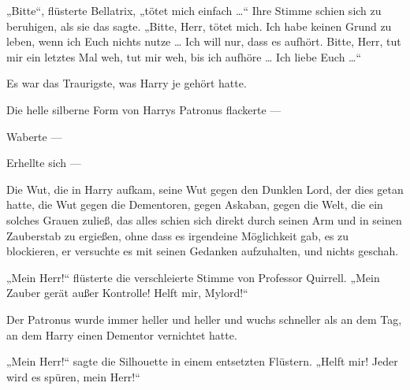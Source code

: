 „Bitte“, flüsterte Bellatrix, „tötet mich einfach …“ Ihre Stimme schien sich zu beruhigen, als sie das sagte.
„Bitte, Herr, tötet mich. Ich habe keinen Grund zu leben, wenn ich Euch nichts nutze … Ich will nur, dass es aufhört. Bitte, Herr, tut mir ein letztes Mal weh, tut mir weh, bis ich aufhöre … Ich liebe Euch …“

Es war das Traurigste, was Harry je gehört hatte.

Die helle silberne Form von Harrys Patronus flackerte —

Waberte —

Erhellte sich —

Die Wut, die in Harry aufkam, seine Wut gegen den Dunklen Lord, der dies getan hatte, die Wut gegen die Dementoren, gegen Askaban, gegen die Welt, die ein solches Grauen zuließ, das alles schien sich direkt durch seinen Arm und in seinen Zauberstab zu ergießen, ohne dass es irgendeine Möglichkeit gab, es zu blockieren, er versuchte es mit seinen Gedanken aufzuhalten, und nichts geschah.

„Mein Herr!“ flüsterte die verschleierte Stimme von Professor Quirrell.
„Mein Zauber gerät außer Kontrolle! Helft mir, Mylord!“

Der Patronus wurde immer heller und heller und wuchs schneller als an dem Tag, an dem Harry einen Dementor vernichtet hatte.

„Mein Herr!“ sagte die Silhouette in einem entsetzten Flüstern.
„Helft mir! Jeder wird es spüren, mein Herr!“

